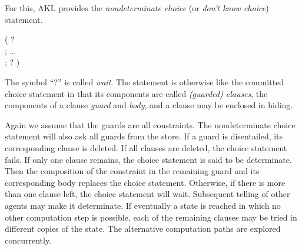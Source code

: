 For this, AKL provides the {\em nondeterminate choice} (or {\em don't
know choice}) statement.
%
\begin{progex}
(  ?  \\
; \dots \\
;  ?  )
\end{progex}%
%
The symbol ``{\prog ?}'' is called {\em wait}.  The statement is
otherwise like the committed choice statement in that its components
are called {\em (guarded) clauses}, the components of a clause {\em
guard} and {\em body}, and a clause may be enclosed in hiding.

Again we assume that the guards are all constraints.  The
nondeterminate choice statement will also ask all guards from the
store.  If a guard is disentailed, its corresponding clause is
deleted.  If all clauses are deleted, the choice statement fails.  If
only one clause remains, the choice statement is said to be
determinate.  Then the composition of the constraint in the remaining
guard and its corresponding body replaces the choice statement.
Otherwise, if there is more than one clause left, the choice statement
will wait.  Subsequent telling of other agents may make it
determinate.  If eventually a state is reached in which no other
computation step is possible, each of the remaining clauses may be
tried in different copies of the state.  The alternative computation
paths are explored concurrently.

